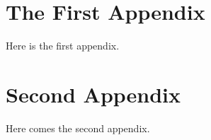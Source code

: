 \begin{appendix}


\chapter{The First Appendix}

Here is the first appendix.


\chapter{Second Appendix}

Here comes the second appendix.


\end{appendix}
